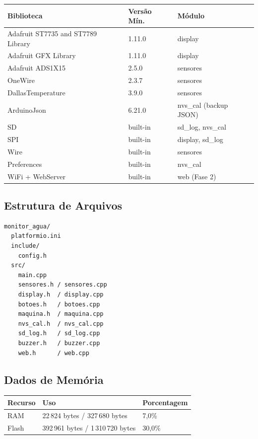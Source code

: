 \documentclass[12pt,a4paper]{article}
\begin{document}
\begin{tabularx}{\textwidth}{l l X}
\toprule
\textbf{Biblioteca} & \textbf{Versão Mín.} & \textbf{Módulo} \\
\midrule
Adafruit ST7735 and ST7789 Library & 1.11.0 & display \\
Adafruit GFX Library & 1.11.0 & display \\
Adafruit ADS1X15 & 2.5.0 & sensores \\
OneWire & 2.3.7 & sensores \\
DallasTemperature & 3.9.0 & sensores \\
ArduinoJson & 6.21.0 & nvs\_cal (backup JSON) \\
SD & built-in & sd\_log, nvs\_cal \\
SPI & built-in & display, sd\_log \\
Wire & built-in & sensores \\
Preferences & built-in & nvs\_cal \\
WiFi + WebServer & built-in & web (Fase 2) \\
\bottomrule
\end{tabularx}

\subsection{Estrutura de Arquivos}

\begin{lstlisting}[language={}, caption={Estrutura do projeto PlatformIO}]
monitor_agua/
  platformio.ini
  include/
    config.h
  src/
    main.cpp
    sensores.h / sensores.cpp
    display.h  / display.cpp
    botoes.h   / botoes.cpp
    maquina.h  / maquina.cpp
    nvs_cal.h  / nvs_cal.cpp
    sd_log.h   / sd_log.cpp
    buzzer.h   / buzzer.cpp
    web.h      / web.cpp
\end{lstlisting}

\subsection{Dados de Memória}

\begin{tabularx}{\textwidth}{l l X}
\toprule
\textbf{Recurso} & \textbf{Uso} & \textbf{Porcentagem} \\
\midrule
RAM & 22\,824 bytes / 327\,680 bytes & 7,0\% \\
Flash & 392\,961 bytes / 1\,310\,720 bytes & 30,0\% \\
\bottomrule
\end{tabularx}
\end{document}
